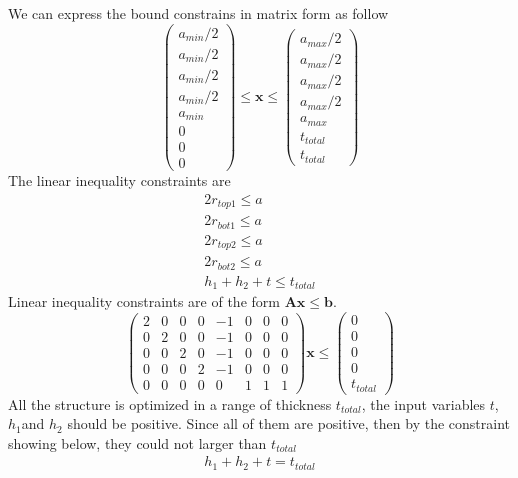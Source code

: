 \documentclass[12pt]{article}
\numberwithin{equation}{section}
\numberwithin{equation}{section}
\begin{document}
\begin{outline}[enumerate]
We can express the bound constrains in matrix form as follow
\begin{equation}
\left(
\begin{matrix}
a_{min}/2\\ 
a_{min}/2\\ 
a_{min}/2\\ 
a_{min}/2\\
a_{min}\\ 
0 \\
0 \\
0 
\end{matrix} \right )
\leq \mathbf{x}
 \leq 
 \left(
\begin{matrix}
a_{max}/2 \\ a_{max}/2 \\ a_{max}/2 \\ a_{max}/2 \\ a_{max} \\ t_{total} \\t_{total}
\end{matrix} \right )
\end{equation}
The linear inequality constraints are 
\begin{align*} 
2r_{top1} \leq a \\
2r_{bot1} \leq a \\
2r_{top2} \leq a \\
2r_{bot2} \leq a \\
h_1+h_2+t \leq t_{total} 
\end{align*}
Linear inequality constraints are of the form $\mathbf{A} \mathbf{x} \leq \mathbf{b}$.
\setcounter{MaxMatrixCols}{20}
\begin{equation}
\left(
\begin{matrix}
2 & 0 & 0 & 0 & -1 & 0 & 0 &0  \\
0 & 2 & 0 & 0 & -1 & 0 & 0 &0\\
0 & 0 & 2 & 0 & -1& 0 & 0 &0\\
0 & 0 & 0 & 2 & -1& 0 & 0 &0\\
0 & 0 & 0 & 0 & 0 & 1 & 1 &1
\end{matrix}
\right ) \mathbf{x}  \leq \left ( \begin{matrix} 0\\ 0\\ 0\\ 0\\ t_{total} \end{matrix} \right ) 
\end{equation}
All the structure is optimized in a range of thickness $t_{total}$, the input variables $t$, $h_1$and $h_2$ should be positive. Since all of them are positive, then by the constraint showing below, they could not larger than $t_{total}$
\begin{align}
\boxed{h_1+h_2+t=t_{total} }
 \end{align} 
 

\end{outline}
\end{document}
